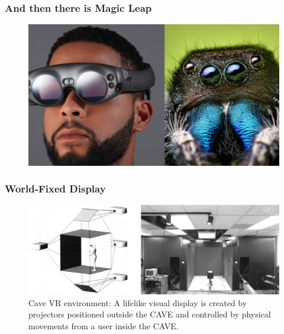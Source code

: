\begin{frame}
	\frametitle{And then there is Magic Leap}
	\begin{figure}
		\includegraphics[scale=0.3]{assets/leap.png}
	\end{figure}
\end{frame}

\begin{frame}
	\frametitle{World-Fixed Display}
	\begin{figure}
		\includegraphics[scale=0.3]{assets/cave.jpg}
		\caption{Cave VR environment: A lifelike visual display is created by projectors positioned outside the CAVE and controlled by physical movements from a user inside the CAVE.}
	\end{figure}
\end{frame}

